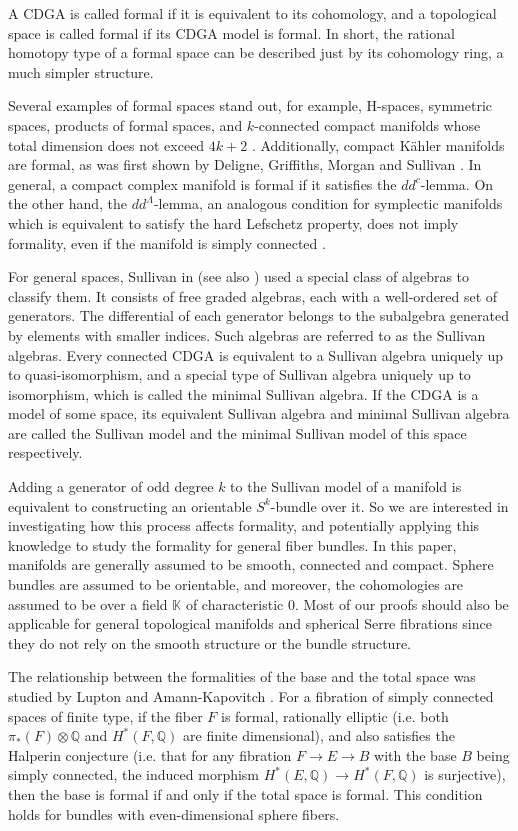 \documentclass{article}
\theoremstyle{plain}
\theoremstyle{definition}
\theoremstyle{plain}
\numberwithin{equation}{section}
\begin{document}
A CDGA is called formal if it is equivalent to its cohomology, and a topological space is called formal if its CDGA model is formal. In short, the rational homotopy type of a formal space can be described just by its cohomology ring, a much simpler structure.

Several examples of formal spaces stand out, for example, H-spaces, symmetric spaces, products of formal spaces, and $k$-connected compact manifolds whose total dimension does not exceed $4k+2$ \cite{miller}. Additionally, compact K\"ahler manifolds are formal, as was first shown by Deligne, Griffiths, Morgan and Sullivan \cite{deli}. In general, a compact complex manifold is formal if it satisfies the $dd^c$-lemma. On the other hand, the $dd^{\Lambda}$-lemma, an analogous condition for symplectic manifolds which is equivalent to satisfy the hard Lefschetz property, does not imply formality, even if the manifold is simply connected \cite{caval}.

For general spaces, Sullivan in \cite{Sullivan} (see also \cite{deli}) used a special class of algebras to classify them. It consists of free graded algebras, each with a well-ordered set of generators. The differential of each generator belongs to the subalgebra generated by elements with smaller indices. Such algebras are referred to as the Sullivan algebras. Every connected CDGA is equivalent to a Sullivan algebra uniquely up to quasi-isomorphism, and a special type of Sullivan algebra uniquely up to isomorphism, which is called the minimal Sullivan algebra. If the CDGA is a model of some space, its equivalent Sullivan algebra and minimal Sullivan algebra are called the Sullivan model and the minimal Sullivan model of this space respectively.

Adding a generator of odd degree $k$ to the Sullivan model of a manifold is equivalent to constructing an orientable $S^k$-bundle over it. So we are interested in investigating how this process affects formality, and potentially applying this knowledge to study the formality for general fiber bundles. In this paper, manifolds are generally assumed to be smooth, connected and compact. Sphere bundles are assumed to be orientable, and moreover, the cohomologies are assumed to be over a field $\mathbb{K}$ of characteristic 0. Most of our proofs should also be applicable for general topological manifolds and spherical Serre fibrations since they do not rely on the smooth structure or the bundle structure.

The relationship between the formalities of the base and the total space was studied by Lupton \cite{Lupton} and Amann-Kapovitch \cite{AK}. For a fibration of simply connected spaces of finite type, if the fiber $F$ is formal, rationally elliptic (i.e. both $\pi_*(F)\otimes\mathbb{Q}$ and $H^*(F,\mathbb{Q})$ are finite dimensional), and also satisfies the Halperin conjecture (i.e. that for any fibration $F\to E\to B$ with the base $B$ being simply connected, the induced morphism $H^*(E,\mathbb{Q})\to H^*(F,\mathbb{Q})$ is surjective), then the base is formal if and only if the total space is formal. This condition holds for bundles with even-dimensional sphere fibers.
\end{document}

